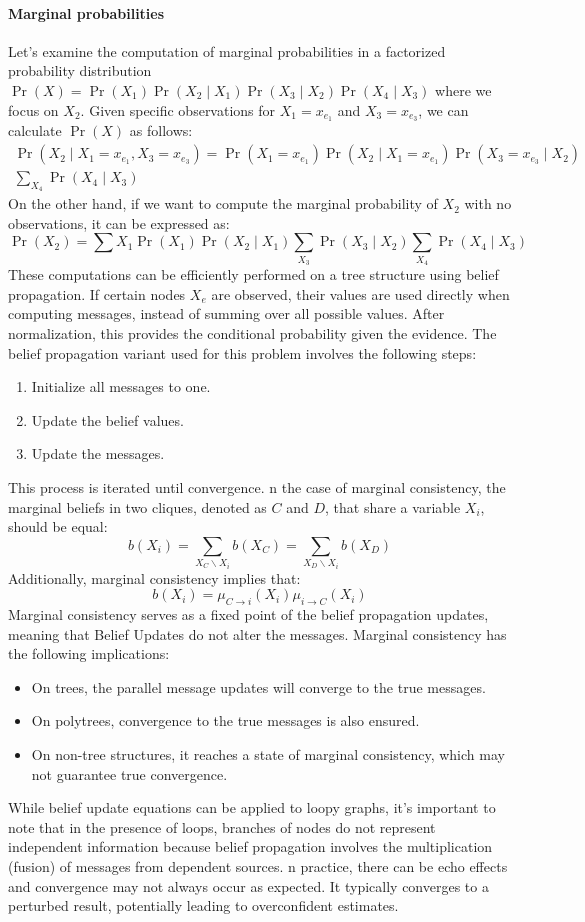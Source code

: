 \paragraph*{Marginal probabilities}
Let's examine the computation of marginal probabilities in a factorized probability distribution $\Pr(X)=\Pr( X_1) \Pr (X_2\mid X_1) \Pr (X_3\mid X_2) \Pr (X_4\mid X_3)$ where we focus on $X_2$. 
Given specific observations for $X_1=x_{e_1}$ and $X_3=x_{e_3}$, we can calculate $\Pr(X)$ as follows:
\begin{multline*}
\Pr (X_2\mid X_1 = x_{e_1}, X_3 = x_{e_3})= \Pr (X_1 = x_{e_1})\Pr (X_2\mid X_1 = x_{e_1})\Pr (X_3 = x_{e_3}\mid X_2) \\ \sum_{X_4}\Pr (X_4\mid X_3)
\end{multline*}
On the other hand, if we want to compute the marginal probability of $X_2$ with no observations, it can be expressed as:
\[\Pr(X_2)=\sum{X_1}\Pr(X_1)\Pr(X_2\mid X_1)\sum_{X_3}\Pr(X_3\mid X_2)\sum_{X_4}\Pr(X_4\mid X_3)\]
These computations can be efficiently performed on a tree structure using belief propagation. 
If certain nodes $X_e$ are observed, their values are used directly when computing messages, instead of summing over all possible values.
After normalization, this provides the conditional probability given the evidence.
The belief propagation variant used for this problem involves the following steps:
\begin{enumerate}
    \item Initialize all messages to one.
    \item Update the belief values.
    \item Update the messages.
\end{enumerate}
This process is iterated until convergence.
n the case of marginal consistency, the marginal beliefs in two cliques, denoted as $C$ and $D$, that share a variable $X_i$, should be equal:
\[b(X_i)=\sum_{X_C \backslash X_i}b(X_C)=\sum_{X_D \backslash X_i}b(X_D)\]
Additionally, marginal consistency implies that:
\[b(X_i)=\mu_{C \rightarrow i}(X_i)\mu_{i \rightarrow C}(X_i)\]
Marginal consistency serves as a fixed point of the belief propagation updates, meaning that Belief Updates do not alter the messages.
Marginal consistency has the following implications:
\begin{itemize}
    \item On trees, the parallel message updates will converge to the true messages.
    \item On polytrees, convergence to the true messages is also ensured.
    \item On non-tree structures, it reaches a state of marginal consistency, which may not guarantee true convergence.
\end{itemize}
While belief update equations can be applied to loopy graphs, it's important to note that in the presence of loops, branches of nodes do not represent independent information because belief propagation involves the multiplication (fusion) of messages from dependent sources.
n practice, there can be echo effects and convergence may not always occur as expected. 
It typically converges to a perturbed result, potentially leading to overconfident estimates.